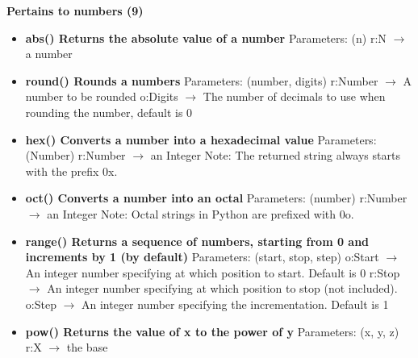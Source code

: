 \documentclass{report}
\begin{document}
      \begin{center}
        \textbf{Pertains to numbers (9)}
      \end{center}
      \begin{itemize}
        \item[\ding{43}] \textbf{abs()	Returns the absolute value of a number}
          \smallbreak \noindent
          Parameters: (n)
          \smallbreak \noindent
          r:N $\rightarrow$ a number
          \smallbreak \noindent
        \item[\ding{43}] \textbf{round()	Rounds a numbers}
          \smallbreak \noindent
          Parameters: (number, digits)
          \smallbreak \noindent
          r:Number $\rightarrow$ A number to be rounded
          \smallbreak \noindent
          o:Digits $\rightarrow$ The number of decimals to use when rounding the number, default is 0
          \smallbreak \noindent
        \item[\ding{43}] \textbf{hex()	Converts a number into a hexadecimal value}
          \smallbreak \noindent
          Parameters: (Number) 
          \smallbreak \noindent
          r:Number $\rightarrow$ an Integer
          \smallbreak \noindent
          Note: The returned string always starts with the prefix 0x.
          \smallbreak \noindent
        \item[\ding{43}] \textbf{oct()	Converts a number into an octal}
          \smallbreak \noindent
          Parameters: (number)
          \smallbreak \noindent
          r:Number $\rightarrow$ an Integer
          \smallbreak \noindent
          Note: Octal strings in Python are prefixed with 0o.
          \smallbreak \noindent
        \item[\ding{43}] \textbf{range()	Returns a sequence of numbers, starting from 0 and increments by 1 (by default)}
          \smallbreak \noindent
          Parameters: (start, stop, step)
          \smallbreak \noindent
          o:Start $\rightarrow$ An integer number specifying at which position to start. Default is 0
          \smallbreak \noindent
          r:Stop $\rightarrow$ An integer number specifying at which position to stop (not included).
          \smallbreak \noindent
          o:Step $\rightarrow$ An integer number specifying the incrementation. Default is 1
          \smallbreak \noindent
        \item[\ding{43}] \textbf{pow()	Returns the value of x to the power of y}
          \smallbreak \noindent
          Parameters: (x, y, z)
          \smallbreak \noindent
          r:X $\rightarrow$ the base

\end{itemize}
\end{document}
